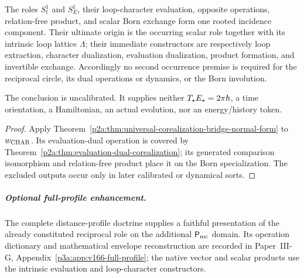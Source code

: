 \documentclass[12pt,a4paper]{article}
\begin{document}
\begin{corollary}
\label{p3a:cor:s1-universal-corealization-bridge}
The roles \(S^1_t\) and \(S^1_E\), their loop-character evaluation,
opposite operations, relation-free product, and scalar Born exchange form one
rooted incidence component.  Their ultimate origin is the occurring scalar
role together with its intrinsic loop lattice \(\Lambda\); their immediate
constructors are respectively loop extraction, character dualization,
evaluation dualization, product formation, and invertible exchange.
Accordingly no second occurrence premise is required for the reciprocal
circle, its dual operations or dynamics, or the Born involution.

The conclusion is uncalibrated.  It supplies neither
\(T_\star E_\star=2\pi\hbar\), a time orientation, a Hamiltonian, an actual
evolution, nor an energy/history token.
\end{corollary}

\begin{proof}
Apply Theorem~\ref{p2a:thm:universal-corealization-bridge-normal-form} to
\(w_{\rm CHAR}\).  Its evaluation-dual operation is covered by
Theorem~\ref{p2a:thm:evaluation-dual-corealization}; its generated comparison
isomorphism and relation-free product place it on the Born specialization.
The excluded outputs occur only in later calibrated or dynamical sorts.
\end{proof}

\subparagraph{Optional full-profile enhancement.}
The complete distance-profile doctrine supplies a faithful presentation of
the already constituted reciprocal role on the additional
\(\mathsf P_{\rm mc}\) domain. Its operation dictionary and mathematical
envelope reconstruction are recorded in
Paper~III-G, Appendix~\ref{p3a:app:v166-full-profile}; the native vector and scalar
products use the intrinsic evaluation and loop-character constructors.
\end{document}
